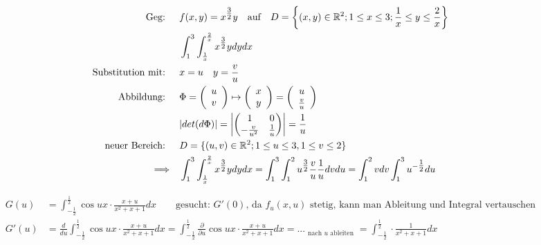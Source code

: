 \documentclass[a4paper]{article}
\begin{document}
		\begin{fmerke}
			\begin{align*}
				\text{Geg: } \quad &f(x,y) = x^{\tfrac{3}{2}} y \quad \text{auf} \quad D= \left\{(x,y) \in \mathbb{R}^2; 1 \leq x \leq 3; \frac{1}{x} \leq y \leq \frac{2}{x}\right\}\\
						&\int_1^3 \int_{\frac{1}{x}}^\frac{2}{x} x^{\tfrac{3}{2}} y dy dx \\
				\text{Substitution mit: } \quad &x=u \quad y= \frac{v}{u}\\
				\text{Abbildung: }\quad &\Phi = \left( \begin{array}{c} u \\ v \end{array} \right) \mapsto \left( \begin{array}{c} x \\ y \end{array} \right) = \left( \begin{array}{c} u \\ \tfrac{v}{u} \end{array} \right)\\
				&|det(d \Phi)| = \left| \begin{pmatrix} 1 & 0 \\ -\tfrac{v}{u^2} & \tfrac{1}{u}\end{pmatrix} \right| =  \frac{1}{u}\\
				\text{neuer Bereich: } \quad &D = \{(u,v) \in \mathbb{R}^2; 1 \leq u \leq 3, 1 \leq v \leq 2 \} \\
				\Longrightarrow \quad &\int_1^3 \int_{\frac{1}{x}}^\frac{2}{x} x^{\tfrac{3}{2}} y dy dx = \int_1^3 \int_1^2 u^{\tfrac{3}{2}} \frac{v}{u} \frac{1}{u} dvdu = \int_1^2 v dv \int_1^3 u^{-\tfrac{1}{2}} du
			\end{align*}

		\end{fmerke}
		
		\begin{fmerke}
			\begin{align*}
				G(u) &= \int_{- \frac{1}{2}}^{\frac{1}{2}} \cos ux \cdot \frac{x + u}{x^2 + x + 1} dx \qquad \text{gesucht: }G'(0) \text{, da $f_u(x,u)$ stetig, kann man Ableitung und Integral vertauschen}\\
				G'(u) &= \frac{d}{du} \int_{- \frac{1}{2}}^{\frac{1}{2}} \cos ux \cdot \frac{x + u}{x^2 + x + 1} dx
					= \int_{- \frac{1}{2}}^{\frac{1}{2}} \frac{\partial}{\partial u} \cos ux \cdot \frac{x + u}{x^2 + x + 1} dx
					= \text{...}_{\substack{\text{nach $u$ ableiten}}}
					= \int_{- \frac{1}{2}}^{\frac{1}{2}} \cdot \frac{1}{x^2 + x + 1} dx
			\end{align*}

		\end{fmerke}
		
\end{document}
